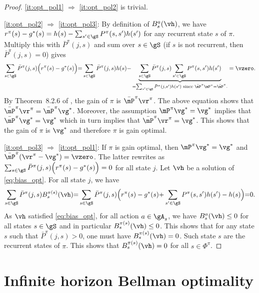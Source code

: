 \begin{proof}
    \ref{it:opt_pol1} $\Rightarrow$ \ref{it:opt_pol2} is trivial.

    \ref{it:opt_pol2} $\Rightarrow$ \ref{it:opt_pol3}: By definition of $B_s^a(\vh)$, we have $r^{\pi}(s)-g^*(s) = h(s)-\sum_{s'\in\gS} P^{\pi}(s,s')h(s')$ for any recurrent state $s$ of $\pi$.  Multiply this with $\bar{P}^\pi(j,s)$ and sum over $s\in\gS$ (if $s$ is not recurrent, then $\bar{P}^\pi(j,s)=0$) gives
    \begin{align*}
        \sum_{s\in\gS} \bar{P}^\pi(j,s)\Big(r^{\pi}(s)-g^*(s)\Big) {=} \sum_{s\in\gS} \bar{P}^\pi(j,s)h(s) {-} \underbrace{\sum_{s\in\gS} \bar{P}^\pi(j,s)\sum_{s'\in\gS} P^{\pi}(s,s')h(s')}_{=\sum_{s'\in\gS} \bar{P}^\pi(j,s')h(s') \text{ since $\bar{\mP}^\pi\mP^\pi{=}\bar{\mP}^\pi$.}}
        = \vzero.
    \end{align*}
    By Theorem~8.2.6 of \cite{puterman2014markov}, the gain of $\pi$ is $\bar{\mP}^\pi \vr^\pi$. The above equation shows that $\bar{\mP}^\pi\vr^\pi = \bar{\mP}^\pi\vg^*$. Moreover, the assumption  $\mP^\pi\vg^*=\vg^*$ implies that $\bar{\mP}^\pi\vg^*=\vg^*$ which in turn implies that $\bar{\mP}^\pi\vr^\pi=\vg^*$. This shows that the gain of $\pi$ is $\vg^*$ and therefore $\pi$ is gain optimal.

    \ref{it:opt_pol3} $\Rightarrow$ \ref{it:opt_pol1}: If $\pi$ is gain optimal, then $\mP^\pi \vg^*=\vg^*$ and $\bar{\mP}^\pi(\vr^\pi-\vg^*)=\vzero$.
    The latter rewrites as $\sum_{s\in\gS}\bar{P}^\pi(j,s)\Big(r^{\pi}(s)-g^*(s)\Big) =0$ for all state $j$. Let $\vh$ be a solution of \eqref{eq:bias_opt}.
    For all state $j$, we have    
    \begin{align*}
        \sum_{s\in\gS}\bar{P}^\pi(j,s)B^{\pi(s)}_s(\vh) {=} \sum_{s\in\gS}\bar{P}^\pi(j,s)\Big(r^{\pi}(s)-g^*(s) {+}\sum_{s'\in\gS}P^{\pi}(s,s')h(s') -h(s)\Big) {=}0.
    \end{align*}
    As $\vh$ satisfied \eqref{eq:bias_opt}, for all action $a\in\gA_s$, we have $B^{a}_s(\vh) \le0$ for all states $s\in\gS$ and in particular $B^{\pi(s)}_s(\vh) \le0$.
    This shows that for any state $s$ such that $\bar{P}^\pi(j,s)>0$, one must have $B^{\pi(s)}_s(\vh) =0$. Such state $s$ are the recurrent states of $\pi$.
    This shows that $B^{\pi(s)}_s(\vh) =0$ for all $s\in\Phi^\pi$.
\end{proof}

\section{Infinite horizon Bellman optimality}
\label{ch:mdp:sec:bell}

